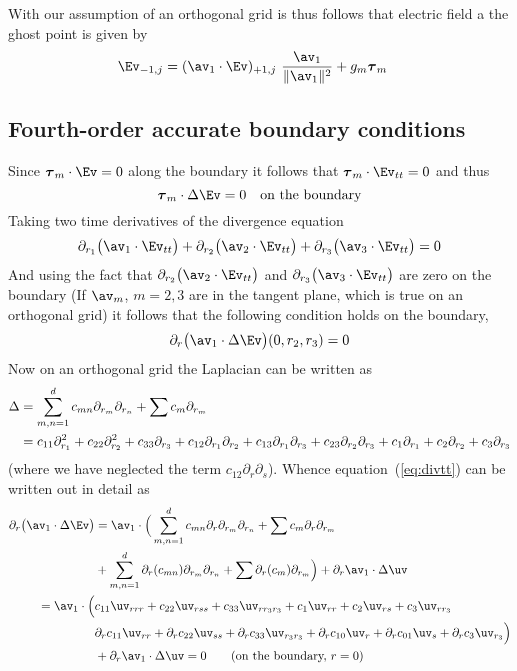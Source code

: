 With our assumption of an orthogonal grid is thus follows that electric field a the 
ghost point is given by
\begin{align*}
\Ev_{-1,j} &= (\av_1\cdot\Ev)_{+1,j} ~{\av_1\over \| \av_1 \|^2} + g_m \tauv_m
\end{align*}


\subsection{Fourth-order accurate boundary conditions}

Since $\tauv_m\cdot \Ev=0$ along the boundary it follows that $\tauv_m\cdot \Ev_{tt}=0$ and thus
\[
   \tauv_m \cdot\Delta \Ev = 0 \quad\mbox{on the boundary}
\]
Taking two time derivatives of the divergence equation
\[
  \pra\big(\av_1\cdot \Ev_{tt} \big) + \prb\big(\av_2\cdot \Ev_{tt}\big) + \prc\big(\av_3\cdot \Ev_{tt}  \big) =0 
\]
And using the fact that $\prb\big(\av_2\cdot \Ev_{tt}\big)$ and 
$\prc\big(\av_3\cdot \Ev_{tt}\big)$ are zero on the boundary
(If $\av_m$, $m=2,3$ are in the tangent plane, which is true on an orthogonal grid) it follows that
the following condition holds on the boundary,
\begin{equation}
  \partial_r\big(\av_1\cdot \Delta\Ev \big) (0,r_2,r_3) =0   \label{eq:divtt}
\end{equation}
Now on an orthogonal grid the Laplacian can be written as
\begin{align}
   \Delta  &= \sum_{m,n=1}^d  c_{mn} \partial_{r_m}\partial_{r_n} + \sum c_m \partial_{r_m} \\
           &= c_{11} \partial_{r_1}^2 + c_{22}\partial_{r_2}^2 + c_{33}\partial_{r_3}  + 
              c_{12} \partial_{r_1}\partial_{r_2} + c_{13}\partial_{r_1}\partial_{r_3} + c_{23}\partial_{r_2}\partial_{r_3}  +
              c_{1} \partial_{r_1} + c_{2} \partial_{r_2}+ c_{3} \partial_{r_3}
\end{align}
(where we have neglected the term $c_{12}\partial_r\partial_s$).
Whence equation~(\ref{eq:divtt}) can be written out in detail as
\begin{align}
   \partial_r\big(\av_1\cdot \Delta\Ev \big) &= 
  \av_1\cdot\Big( \sum_{m,n=1}^d  c_{mn} \partial_r\partial_{r_m}\partial_{r_n} 
                   + \sum c_m \partial_r\partial_{r_m} \label{eq:DrADotuv} \\
 ~~~&+ \sum_{m,n=1}^d  \partial_r(c_{mn}) \partial_{r_m}\partial_{r_n} + \sum \partial_r(c_m) \partial_{r_m} \Big) 
   +  \partial_r\av_1\cdot \Delta\uv \\
=  \av_1\cdot\Big( &c_{11} \uv_{rrr} + c_{22}\uv_{rss} + c_{33}\uv_{r\rc\rc} 
             + c_{1}\uv_{rr} + c_{2}\uv_{rs} + c_{3}\uv_{r\rc}  \label{eq:divtte}\\
                  &\partial_r c_{11} \uv_{rr} + \partial_r c_{22}\uv_{ss} + \partial_r c_{33}\uv_{\rc\rc} 
                   + \partial_r c_{10}\uv_{r} + \partial_r c_{01}\uv_{s}+ \partial_r c_{3}\uv_{\rc} \Big) \\
   &  + \partial_r\av_1\cdot \Delta\uv = 0 \qquad\mbox{(on the boundary, $r=0$)}
\end{align}
